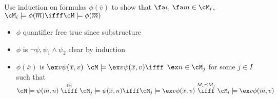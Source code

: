 \begin{pf}
    Use induction on formulas $\phi(\overline{v})$ to show that $\fa i, \, \fa m \in \cM_i$, $\cM_i \models \phi(\overline{m}) \ifff \cM \models \phi(\overline{m})$ 
    \begin{itemize}
        \item $\phi$ quantifier free true since substructure 
        \item $\phi$ is $\neg \psi, \psi_1 \wedge \psi_2$ clear by induction 
        \item $\phi(\overline{x})$ is $\ex v \psi(\overline{x}, v)$ $\cM \models \ex v \psi(\overline{x}, v) \ifff$ $\ex n \in \cM_j$ for some $j \in I$ such that $\cM \models \psi(\overline{m}, n) \\ \stackrel{\text{IH}}{\ifff} \cM_j \models \psi(\overline{x}, n) \ifff \cM_j \models \ex v \phi(\overline{x}, v) \stackrel{M_i \preceq M_j}{\ifff} \cM_i \models \ex v \phi(\overline{m},v)$ 
    \end{itemize}
\end{pf}